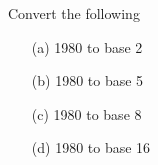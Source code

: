 Convert the following
\begin{enumerate}[nosep]
  \item[(a)] 1980 to base 2
  \item[(b)] 1980 to base 5
  \item[(c)] 1980 to base 8
  \item[(d)] 1980 to base 16
\end{enumerate}
